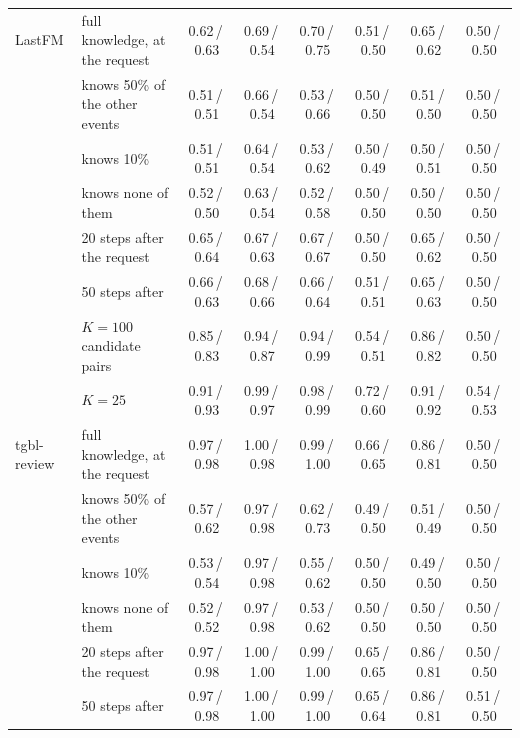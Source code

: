 \begin{table}[!htb]
\begin{tabular}{@{}llcccccc@{}}
LastFM & full knowledge, at the request & 0.62\,/\,0.63 & 0.69\,/\,0.54 & 0.70\,/\,0.75 & 0.51\,/\,0.50 & 0.65\,/\,0.62 & 0.50\,/\,0.50 \\
 & knows 50\% of the other events & 0.51\,/\,0.51 & 0.66\,/\,0.54 & 0.53\,/\,0.66 & 0.50\,/\,0.50 & 0.51\,/\,0.50 & 0.50\,/\,0.50 \\
 & knows 10\% & 0.51\,/\,0.51 & 0.64\,/\,0.54 & 0.53\,/\,0.62 & 0.50\,/\,0.49 & 0.50\,/\,0.51 & 0.50\,/\,0.50 \\
 & knows none of them & 0.52\,/\,0.50 & 0.63\,/\,0.54 & 0.52\,/\,0.58 & 0.50\,/\,0.50 & 0.50\,/\,0.50 & 0.50\,/\,0.50 \\
 & 20 steps after the request & 0.65\,/\,0.64 & 0.67\,/\,0.63 & 0.67\,/\,0.67 & 0.50\,/\,0.50 & 0.65\,/\,0.62 & 0.50\,/\,0.50 \\
 & 50 steps after & 0.66\,/\,0.63 & 0.68\,/\,0.66 & 0.66\,/\,0.64 & 0.51\,/\,0.51 & 0.65\,/\,0.63 & 0.50\,/\,0.50 \\
 & $K=100$ candidate pairs & 0.85\,/\,0.83 & 0.94\,/\,0.87 & 0.94\,/\,0.99 & 0.54\,/\,0.51 & 0.86\,/\,0.82 & 0.50\,/\,0.50 \\
 & $K=25$ & 0.91\,/\,0.93 & 0.99\,/\,0.97 & 0.98\,/\,0.99 & 0.72\,/\,0.60 & 0.91\,/\,0.92 & 0.54\,/\,0.53 \\
\midrule
tgbl-review & full knowledge, at the request & 0.97\,/\,0.98 & 1.00\,/\,0.98 & 0.99\,/\,1.00 & 0.66\,/\,0.65 & 0.86\,/\,0.81 & 0.50\,/\,0.50 \\
 & knows 50\% of the other events & 0.57\,/\,0.62 & 0.97\,/\,0.98 & 0.62\,/\,0.73 & 0.49\,/\,0.50 & 0.51\,/\,0.49 & 0.50\,/\,0.50 \\
 & knows 10\% & 0.53\,/\,0.54 & 0.97\,/\,0.98 & 0.55\,/\,0.62 & 0.50\,/\,0.50 & 0.49\,/\,0.50 & 0.50\,/\,0.50 \\
 & knows none of them & 0.52\,/\,0.52 & 0.97\,/\,0.98 & 0.53\,/\,0.62 & 0.50\,/\,0.50 & 0.50\,/\,0.50 & 0.50\,/\,0.50 \\
 & 20 steps after the request & 0.97\,/\,0.98 & 1.00\,/\,1.00 & 0.99\,/\,1.00 & 0.65\,/\,0.65 & 0.86\,/\,0.81 & 0.50\,/\,0.50 \\
 & 50 steps after & 0.97\,/\,0.98 & 1.00\,/\,1.00 & 0.99\,/\,1.00 & 0.65\,/\,0.64 & 0.86\,/\,0.81 & 0.51\,/\,0.50 \\
\bottomrule
\end{tabular}
\end{table}
